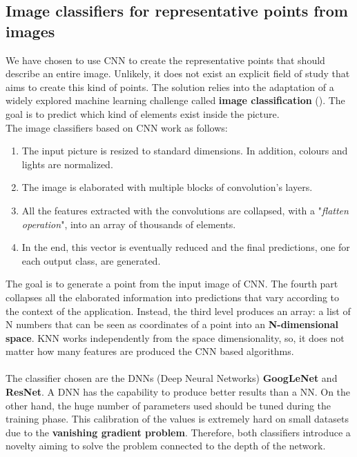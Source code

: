 \subsection{Image classifiers for representative points from images} \label{sec:classifiers}
We have chosen to use CNN to create the representative points that should describe an entire image. Unlikely, it does not exist an explicit field of study that aims to create this kind of points. The solution relies into the adaptation of a widely explored machine learning challenge called \textbf{image classification} (). The goal is to predict which kind of elements exist inside the picture.\\
The image classifiers based on CNN work as follows:
\begin{enumerate}
	\item The input picture is resized to standard dimensions. In addition, colours and lights are normalized.
	\item The image is elaborated with multiple blocks of convolution's layers.
	\item All the features extracted with the convolutions are collapsed, with a "\textit{flatten operation}", into an array of thousands of elements.
	\item In the end, this vector is eventually reduced and the final predictions, one for each output class, are generated.
\end{enumerate}
The goal is to generate a point from the input image of CNN. The fourth part collapses all the elaborated information into predictions that vary according to the context of the application. Instead, the third level produces an array: a list of N numbers that can be seen as coordinates of a point into an \textbf{N-dimensional space}. KNN works independently from the space dimensionality, so, it does not matter how many features are produced the CNN based algorithms.\\
\\
The classifier chosen are the DNNs (Deep Neural Networks) \textbf{GoogLeNet} and \textbf{ResNet}\cite{resNet_model}. A DNN has the capability to produce better results than a NN. On the other hand, the huge number of parameters used should be tuned during the training phase. This calibration of the values is extremely hard on small datasets due to the \textbf{vanishing gradient problem}. Therefore, both classifiers introduce a novelty aiming to solve the problem connected to the depth of the network.

